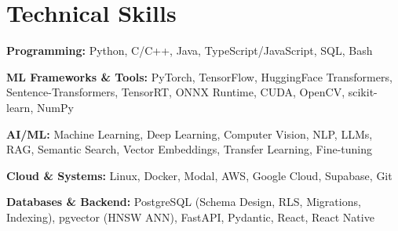 \documentclass[a4paper,10.5pt]{article}
\begin{document}
\section{Technical Skills}
\vspace{3pt}
\begin{itemize}[leftmargin=0.15in, itemsep=1.5pt, topsep=5pt, parsep=0.5pt, partopsep=0.5pt]
\normalsize{
\item \textbf{Programming:} Python, C/C++, Java, TypeScript/JavaScript, SQL, Bash
\item \textbf{ML Frameworks \& Tools:} PyTorch, TensorFlow, HuggingFace Transformers, Sentence-Transformers, TensorRT, ONNX Runtime, CUDA, OpenCV, scikit-learn, NumPy
\item \textbf{AI/ML:} Machine Learning, Deep Learning, Computer Vision, NLP, LLMs, RAG, Semantic Search, Vector Embeddings, Transfer Learning, Fine-tuning
\item \textbf{Cloud \& Systems:} Linux, Docker, Modal, AWS, Google Cloud, Supabase, Git
\item \textbf{Databases \& Backend:} PostgreSQL (Schema Design, RLS, Migrations, Indexing), pgvector (HNSW ANN), FastAPI, Pydantic, React, React Native
}
\end{itemize}
\end{document}
